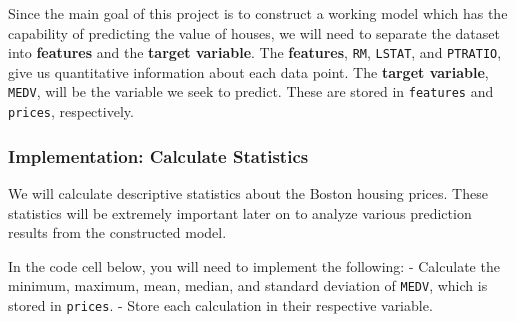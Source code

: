 \documentclass[11pt]{article}
\begin{document}
Since the main goal of this project is to construct a working model
which has the capability of predicting the value of houses, we will need
to separate the dataset into \textbf{features} and the \textbf{target
variable}. The \textbf{features},
\texttt{\textquotesingle{}RM\textquotesingle{}},
\texttt{\textquotesingle{}LSTAT\textquotesingle{}}, and
\texttt{\textquotesingle{}PTRATIO\textquotesingle{}}, give us
quantitative information about each data point. The \textbf{target
variable}, \texttt{\textquotesingle{}MEDV\textquotesingle{}}, will be
the variable we seek to predict. These are stored in \texttt{features}
and \texttt{prices}, respectively.

    \subsubsection{Implementation: Calculate
Statistics}\label{implementation-calculate-statistics}

We will calculate descriptive statistics about the Boston housing
prices. These statistics will be extremely important later on to analyze
various prediction results from the constructed model.

In the code cell below, you will need to implement the following: -
Calculate the minimum, maximum, mean, median, and standard deviation of
\texttt{\textquotesingle{}MEDV\textquotesingle{}}, which is stored in
\texttt{prices}. - Store each calculation in their respective variable.
\end{document}
